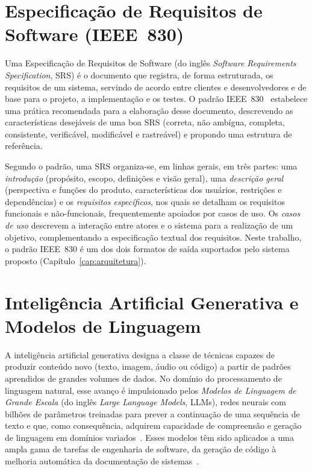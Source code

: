 \section{Especificação de Requisitos de Software (IEEE~830)}
\label{sec:ieee830}

Uma Especificação de Requisitos de Software (do inglês \textit{Software Requirements Specification}, SRS) é o documento que registra, de forma estruturada, os requisitos de um sistema, servindo de acordo entre clientes e desenvolvedores e de base para o projeto, a implementação e os testes. O padrão IEEE~830~\cite{ieee830} estabelece uma prática recomendada para a elaboração desse documento, descrevendo as características desejáveis de uma boa SRS (correta, não ambígua, completa, consistente, verificável, modificável e rastreável) e propondo uma estrutura de referência.

Segundo o padrão, uma SRS organiza-se, em linhas gerais, em três partes: uma \textit{introdução} (propósito, escopo, definições e visão geral), uma \textit{descrição geral} (perspectiva e funções do produto, características dos usuários, restrições e dependências) e os \textit{requisitos específicos}, nos quais se detalham os requisitos funcionais e não-funcionais, frequentemente apoiados por casos de uso. Os \textit{casos de uso} descrevem a interação entre atores e o sistema para a realização de um objetivo, complementando a especificação textual dos requisitos. Neste trabalho, o padrão IEEE~830 é um dos dois formatos de saída suportados pelo sistema proposto (Capítulo~\ref{cap:arquitetura}).

\section{Inteligência Artificial Generativa e Modelos de Linguagem}
\label{sec:llm}

A inteligência artificial generativa designa a classe de técnicas capazes de produzir conteúdo novo (texto, imagem, áudio ou código) a partir de padrões aprendidos de grandes volumes de dados. No domínio do processamento de linguagem natural, esse avanço é impulsionado pelos \textit{Modelos de Linguagem de Grande Escala} (do inglês \textit{Large Language Models}, LLMs), redes neurais com bilhões de parâmetros treinadas para prever a continuação de uma sequência de texto e que, como consequência, adquirem capacidade de compreensão e geração de linguagem em domínios variados~\cite{hort2025survey}. Esses modelos têm sido aplicados a uma ampla gama de tarefas de engenharia de software, da geração de código à melhoria automática da documentação de sistemas~\cite{su2023hotgpt}.


